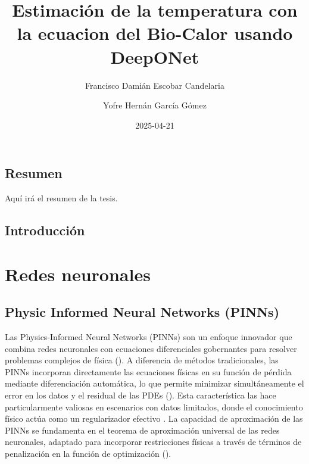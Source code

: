 \documentclass[
  spanish,
  us-letterpaper,
  DIV=11,
  numbers=noendperiod]{scrreprt}
\title{Estimación de la temperatura con la ecuacion del Bio-Calor usando
DeepONet}
\author{Francisco Damián Escobar Candelaria \and Yofre Hernán García
Gómez}
\date{2025-04-21}
\renewcommand*\contentsname{Tabla de contenidos}
\newcommand\contentsname{Tabla de contenidos}
\begin{document}
\maketitle

\renewcommand*\contentsname{Tabla de contenidos}
{
\hypersetup{linkcolor=}
\setcounter{tocdepth}{2}
\tableofcontents
}


\chapter*{Resumen}\label{resumen}


Aquí irá el resumen de la tesis.


\chapter{Introducción}\label{introducciuxf3n}

\part{Redes neuronales}

\chapter{Physic Informed Neural Networks
(PINNs)}\label{physic-informed-neural-networks-pinns}

Las Physics-Informed Neural Networks (PINNs) son un enfoque innovador
que combina redes neuronales con ecuaciones diferenciales gobernantes
para resolver problemas complejos de física
(). A diferencia de
métodos tradicionales, las PINNs incorporan directamente las ecuaciones
físicas en su función de pérdida mediante diferenciación automática, lo
que permite minimizar simultáneamente el error en los datos y el
residual de las PDEs (). Esta característica las hace particularmente valiosas en
escenarios con datos limitados, donde el conocimiento físico actúa como
un regularizador efectivo . La capacidad de aproximación de las PINNs se
fundamenta en el teorema de aproximación universal de las redes
neuronales, adaptado para incorporar restricciones físicas a través de
términos de penalización en la función de optimización
().
\end{document}
